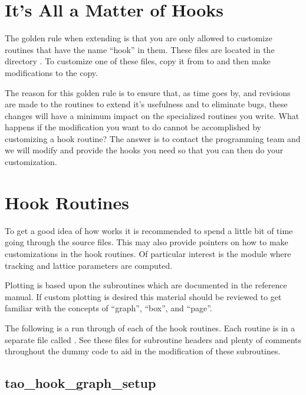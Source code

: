 \section{It's All a Matter of Hooks}

The golden rule when extending \tao is that you are only allowed to
customize routines that have the name ``hook'' in
them. These files are located in the directory .
To customize one of these files, copy it from  to 
and then make modifications to the copy.

The reason for this golden rule is to ensure that, as time
goes by, and revisions are made to the \tao routines to extend it's
usefulness and to eliminate bugs, these changes will
have a minimum impact on the specialized routines you write.
What happens if the modification you want to do cannot be accomplished
by customizing a hook routine? The answer is to contact
the \tao programming team and we will modify \tao and provide the hooks 
you need so that you can then do your customization.

\section{Hook Routines}

To get a good idea of how \tao works it is recommended to spend a
little bit of time going through the source files. This may also
provide pointers on how to make customizations in the hook routines. Of
particular interest is the module  where tracking
and lattice parameters are computed. 

Plotting is based upon the  subroutines which are
documented in the \bmad reference manual. If custom plotting is
desired this material should be reviewed to get familiar with the
concepts of ``graph'', ``box'', and ``page''.

The following is a run through of each of the hook routines. Each
routine is in a separate file called
. See these files for subroutine
headers and plenty of comments throughout the dummy code to aid in the
modification of these subroutines.

\subsection{tao\_hook\_graph\_setup}

